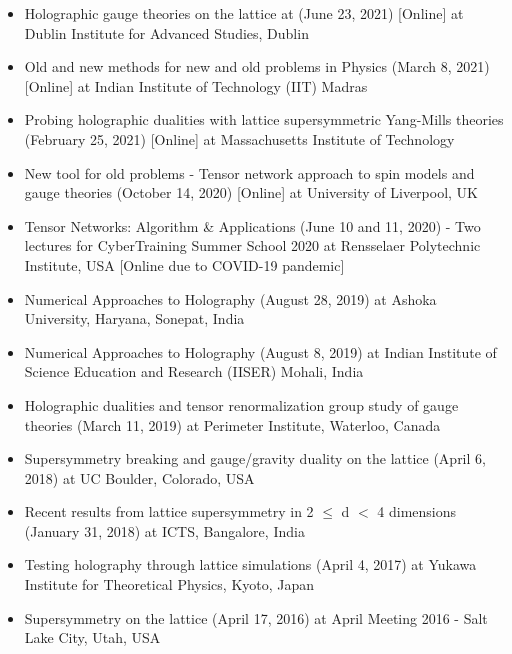 \begin{itemize}
 
 \item Holographic gauge theories on the lattice at 
 (June 23, 2021) [Online] at Dublin Institute for Advanced Studies, Dublin
 \href{https://rgjha.github.io/talks/DIAS_230621.pdf}{{\texttt{}}} 
  \href{https://youtu.be/JzeWm-ykDPk}{{\texttt{}}}
 \item Old and new methods for new and old problems in Physics
 (March 8, 2021) [Online] at Indian Institute of Technology (IIT) Madras
 \href{https://rgjha.github.io/talks/Collo_IITM.pdf}{{\texttt{}}} 
 \item Probing holographic dualities with lattice supersymmetric Yang-Mills theories 
 (February 25, 2021) [Online] at Massachusetts Institute of Technology
 \href{https://rgjha.github.io/talks/MIT_v2.pdf}{{\texttt{}}} 
 \href{http://y2u.be/fO8A18uwYIM}{{\texttt{}}}
 \item New tool for old problems - Tensor network approach to spin models and gauge theories 
 (October 14, 2020) [Online] at University of Liverpool, UK
 \href{https://rgjha.github.io/talks/Seminar_v2.pdf}{{\texttt{}}} 
 \item Tensor Networks: Algorithm \& Applications (June 10 and 11, 2020) - Two lectures for 
 CyberTraining Summer School 2020 at Rensselaer Polytechnic Institute, USA [Online due to COVID-19 pandemic] 
 \href{https://rgjha.github.io/talks/cs2020.pdf}{{\texttt{\COL{[Lecture 1 \& 2]}}}} 
 \item Numerical Approaches to Holography (August 28, 2019) at Ashoka University, Haryana, Sonepat, India
 \href{https://rgjha.github.io/talks/Talk_v1.pdf}{{\texttt{}}} 
 \item Numerical Approaches to Holography (August 8, 2019) at Indian Institute of Science Education and Research (IISER) Mohali, India
  \item Holographic dualities and tensor renormalization group study of gauge theories (March 11, 2019) at Perimeter Institute, Waterloo, Canada 
  \href{https://pirsa.org/19030108}
{{\texttt{}}} 
  \item Supersymmetry breaking and gauge/gravity duality on the lattice (April 6, 2018) at UC Boulder, Colorado, USA \href{https://rgjha.github.io/talks/lbsm18_jha.pdf}{{\texttt{}}} 
  \item Recent results from lattice supersymmetry in 2 $\le$ d $<$ 4 dimensions (January 31, 2018) at ICTS, Bangalore, India \href{https://www.youtube.com/watch?v=Zey6DAEiw0c}{{\texttt{}}} 
 \item Testing holography through lattice simulations (April 4, 2017) at Yukawa Institute for Theoretical Physics, Kyoto, Japan
 \href{https://rgjha.github.io/talks/kyoto_v1.pdf}{{\texttt{\COL{[PDF]}}}}
\item Supersymmetry on the lattice (April 17, 2016) at April Meeting 2016 - Salt Lake City, Utah, USA
\href{https://rgjha.github.io/talks/aps_april.pdf}{{\texttt{}}} 
\end{itemize}

